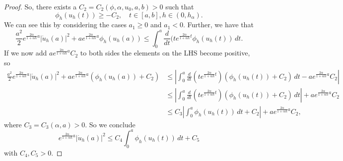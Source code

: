 \documentclass[a4paper,11pt, leqno]{scrreprt} %
\renewcommand{\leq}{\leqslant}
\renewcommand{\leq}{\leqslant}
\renewcommand{\geq}{\geqslant}
\theoremstyle{change}
\theoremstyle{nonumberplain}
\newtheorem{proof}{Proof}
\begin{document}
\begin{proof}
  So, there exists a $C_2 = C_2(\phi, \alpha, u_0, a, b) > 0$ such
  that
  \begin{equation}
    \label{eq:qcsemigroupboundphih}
    \phi_h(u_h(t)) \geq -C_2, \quad t \in [a,b], h \in (0, h_\alpha).
  \end{equation}
  We can see this by considering the cases $a_1 \geq 0$ and $a_1 < 0$.
  Further, we have that 
  \begin{equation*}
    \frac{a^2}2 e^{\frac{2\alpha}{1 + \alpha h}a} |\dot
    u_h(a)|^2 + a e^{\frac{2\alpha}{1 + \alpha h}a}
    \phi_h(u_h(a)) \leq \int_0^a \frac{d}{dt} (t e^{\frac{2\alpha}{1 + \alpha h} t}
     \phi_h(u_h(t)) \, dt.
  \end{equation*}
  If we now add $a e^{\frac{2\alpha}{1 + \alpha h}a} C_2$ to both
  sides the elements on the LHS become positive, so
 \begin{equation*}
   \begin{split}
    \frac{a^2}2 e^{\frac{2\alpha}{1 + \alpha h}a} |\dot
    u_h(a)|^2 + a e^{\frac{2\alpha}{1 + \alpha h}a} (\phi_h(u_h(a)) +
    C_2) &\leq \left | \int_0^a \frac{d}{dt} (t e^{\frac{2\alpha}{1 + \alpha h} t})
     (\phi_h(u_h(t)) + C_2) \, dt - a e^{\frac{2\alpha}{1 +
       \alpha h}a} C_2 \right |\\
     &\leq \left | \int_0^a \frac{d}{dt} (t e^{\frac{2\alpha}{1 + \alpha h} t})
     (\phi_h(u_h(t)) + C_2) \, dt \right | + a e^{\frac{2\alpha}{1 +
       \alpha h}a} C_2\\
   &\leq C_3 \left | \int_0^a \phi_h(u_h(t)) \, dt + C_2 \right| + a e^{\frac{2\alpha}{1 +
       \alpha h}a} C_2,
   \end{split} 
  \end{equation*} 
  where $C_3 = C_3(\alpha, a) > 0$.
  So we conclude
  \begin{equation}
    \label{eq:existencebounduha}
    e^{\frac{2\alpha}{1 + \alpha h}a} |\dot u_h(a)|^2 \leq C_4
    \int_0^a \phi_h(u_h(t)) \, dt + C_5
  \end{equation}
  with $C_4, C_5 > 0$.
  

\end{proof}
\end{document}
